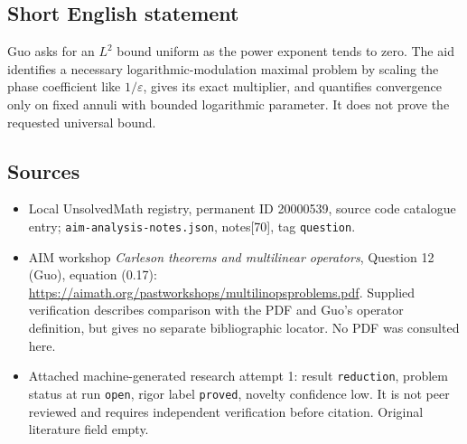 \documentclass[11pt]{article}
\newcommand{\eps}{\varepsilon}
\begin{document}
\subsection{Short English statement}
Guo asks for an $L^2$ bound uniform as the power exponent tends to zero. The aid identifies a necessary logarithmic-modulation maximal problem by scaling the phase coefficient like $1/\eps$, gives its exact multiplier, and quantifies convergence only on fixed annuli with bounded logarithmic parameter. It does not prove the requested universal bound.
\subsection{Sources}
\begin{itemize}
\item Local UnsolvedMath registry, permanent ID 20000539, source code catalogue entry; \texttt{aim-analysis-notes.json}, notes[70], tag \texttt{question}.
\item AIM workshop \emph{Carleson theorems and multilinear operators}, Question 12 (Guo), equation (0.17): \url{https://aimath.org/pastworkshops/multilinopsproblems.pdf}. Supplied verification describes comparison with the PDF and Guo's operator definition, but gives no separate bibliographic locator. No PDF was consulted here.
\item Attached machine-generated research attempt 1: result \texttt{reduction}, problem status at run \texttt{open}, rigor label \texttt{proved}, novelty confidence low. It is not peer reviewed and requires independent verification before citation. Original literature field empty.
\end{itemize}
\end{document}
